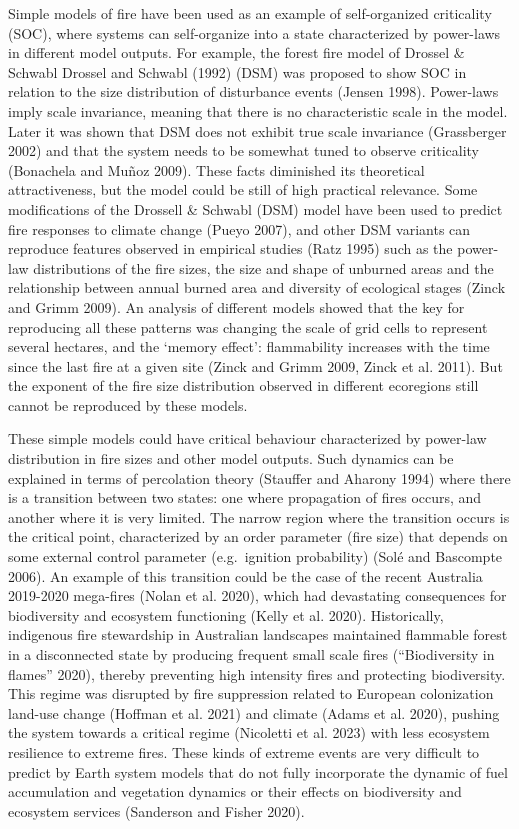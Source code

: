 \documentclass[
]{article}
\begin{document}
Simple models of fire have been used as an example of self-organized
criticality (SOC), where systems can self-organize into a state
characterized by power-laws in different model outputs. For example, the
forest fire model of Drossel \& Schwabl Drossel and Schwabl (1992) (DSM)
was proposed to show SOC in relation to the size distribution of
disturbance events (Jensen 1998). Power-laws imply scale invariance,
meaning that there is no characteristic scale in the model. Later it was
shown that DSM does not exhibit true scale invariance (Grassberger 2002)
and that the system needs to be somewhat tuned to observe criticality
(Bonachela and Muñoz 2009). These facts diminished its theoretical
attractiveness, but the model could be still of high practical
relevance. Some modifications of the Drossell \& Schwabl (DSM) model
have been used to predict fire responses to climate change (Pueyo 2007),
and other DSM variants can reproduce features observed in empirical
studies (Ratz 1995) such as the power-law distributions of the fire
sizes, the size and shape of unburned areas and the relationship between
annual burned area and diversity of ecological stages (Zinck and Grimm
2009). An analysis of different models showed that the key for
reproducing all these patterns was changing the scale of grid cells to
represent several hectares, and the `memory effect': flammability
increases with the time since the last fire at a given site (Zinck and
Grimm 2009, Zinck et al. 2011). But the exponent of the fire size
distribution observed in different ecoregions still cannot be reproduced
by these models.

These simple models could have critical behaviour characterized by
power-law distribution in fire sizes and other model outputs. Such
dynamics can be explained in terms of percolation theory (Stauffer and
Aharony 1994) where there is a transition between two states: one where
propagation of fires occurs, and another where it is very limited. The
narrow region where the transition occurs is the critical point,
characterized by an order parameter (fire size) that depends on some
external control parameter (e.g.~ignition probability) (Solé and
Bascompte 2006). An example of this transition could be the case of the
recent Australia 2019-2020 mega-fires (Nolan et al. 2020), which had
devastating consequences for biodiversity and ecosystem functioning
(Kelly et al. 2020). Historically, indigenous fire stewardship in
Australian landscapes maintained flammable forest in a disconnected
state by producing frequent small scale fires ({``Biodiversity in
flames''} 2020), thereby preventing high intensity fires and protecting
biodiversity. This regime was disrupted by fire suppression related to
European colonization land-use change (Hoffman et al. 2021) and climate
(Adams et al. 2020), pushing the system towards a critical regime
(Nicoletti et al. 2023) with less ecosystem resilience to extreme fires.
These kinds of extreme events are very difficult to predict by Earth
system models that do not fully incorporate the dynamic of fuel
accumulation and vegetation dynamics or their effects on biodiversity
and ecosystem services (Sanderson and Fisher 2020).
\end{document}

